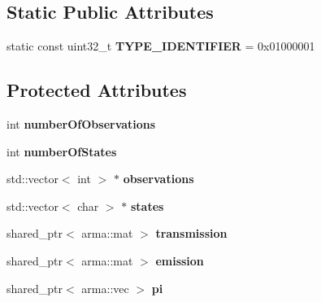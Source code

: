 \subsection*{Static Public Attributes}
\begin{DoxyCompactItemize}
\item 
\hypertarget{classspeech_1_1spelling_1_1HMM_af7d3303cd177e967b5820abee20e924e}{static const uint32\+\_\+t {\bfseries T\+Y\+P\+E\+\_\+\+I\+D\+E\+N\+T\+I\+F\+I\+E\+R} = 0x01000001}\label{classspeech_1_1spelling_1_1HMM_af7d3303cd177e967b5820abee20e924e}

\end{DoxyCompactItemize}
\subsection*{Protected Attributes}
\begin{DoxyCompactItemize}
\item 
\hypertarget{classspeech_1_1spelling_1_1HMM_a9a4067ac48b36326872616ef255d59b6}{int {\bfseries number\+Of\+Observations}}\label{classspeech_1_1spelling_1_1HMM_a9a4067ac48b36326872616ef255d59b6}

\item 
\hypertarget{classspeech_1_1spelling_1_1HMM_a1305b5ef325a521fc952c1d364d24bb8}{int {\bfseries number\+Of\+States}}\label{classspeech_1_1spelling_1_1HMM_a1305b5ef325a521fc952c1d364d24bb8}

\item 
\hypertarget{classspeech_1_1spelling_1_1HMM_a9730a77b166fbd1f676e3f9682d4026f}{std\+::vector$<$ int $>$ $\ast$ {\bfseries observations}}\label{classspeech_1_1spelling_1_1HMM_a9730a77b166fbd1f676e3f9682d4026f}

\item 
\hypertarget{classspeech_1_1spelling_1_1HMM_a28f1957d3c50355e6b5ad346b055c34c}{std\+::vector$<$ char $>$ $\ast$ {\bfseries states}}\label{classspeech_1_1spelling_1_1HMM_a28f1957d3c50355e6b5ad346b055c34c}

\item 
\hypertarget{classspeech_1_1spelling_1_1HMM_a81be786e67fdbff7acd61e36c86b2871}{shared\+\_\+ptr$<$ arma\+::mat $>$ {\bfseries transmission}}\label{classspeech_1_1spelling_1_1HMM_a81be786e67fdbff7acd61e36c86b2871}

\item 
\hypertarget{classspeech_1_1spelling_1_1HMM_afd8de0031aa51c58de818a6d25f96800}{shared\+\_\+ptr$<$ arma\+::mat $>$ {\bfseries emission}}\label{classspeech_1_1spelling_1_1HMM_afd8de0031aa51c58de818a6d25f96800}

\item 
\hypertarget{classspeech_1_1spelling_1_1HMM_a8bcb334bda85869b1b37b2a0a0a2185a}{shared\+\_\+ptr$<$ arma\+::vec $>$ {\bfseries pi}}\label{classspeech_1_1spelling_1_1HMM_a8bcb334bda85869b1b37b2a0a0a2185a}

\end{DoxyCompactItemize}


